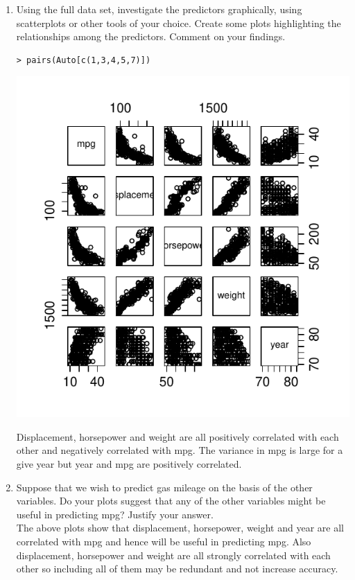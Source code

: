\documentclass[11pt]{article}
\providecommand{\code}[1]{{\color{red}\ttfamily #1}}
\begin{document}
\begin{enumerate}
\begin{enumerate}
\item Using the full data set, investigate the predictors graphically, using scatterplots or other tools of your choice.  Create some plots highlighting the relationships among the predictors.  Comment on your findings.
\begin{lstlisting}
> pairs(Auto[c(1,3,4,5,7)])
\end{lstlisting}
\begin{center}
\includegraphics[scale=1.75]{plot8.pdf}
\end{center}

Displacement, horsepower and weight are all positively correlated with each other and negatively correlated with mpg.  The variance in mpg is large for a give year but year and mpg are positively correlated.  

\item Suppose that we wish to predict gas mileage on the basis of the other variables.  Do your plots suggest that any of the other variables might be useful in predicting \code{mpg}?  Justify your answer.\\

The above plots show that displacement, horsepower, weight and year are all correlated with mpg and hence will be useful in predicting mpg.  Also displacement, horsepower and weight are all strongly correlated with each other so including all of them may be redundant and not increase accuracy.
\end{enumerate}


\end{enumerate}
\end{document}
